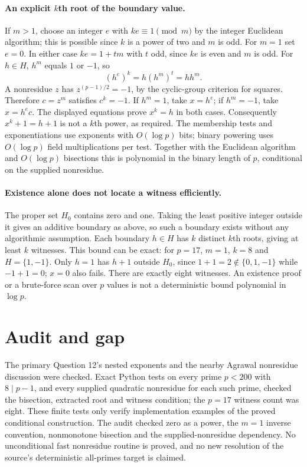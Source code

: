 \documentclass[11pt]{article}
\begin{document}
\paragraph{An explicit $k$th root of the boundary value.}
If $m>1$, choose an integer $e$ with $ke\equiv1\pmod m$ by the
integer Euclidean algorithm; this is possible since $k$ is a power of
two and $m$ is odd. For $m=1$ set $e=0$. In either case
$ke=1+tm$ with $t$ odd, since $ke$ is even and $m$ is odd.
For $h\in H$, $h^m$ equals $1$ or $-1$, so
\[
(h^e)^k=h(h^m)^t=h h^m.
\]
A nonresidue $z$ has $z^{(p-1)/2}=-1$, by the cyclic-group
criterion for squares. Therefore $c=z^m$ satisfies $c^k=-1$.
If $h^m=1$, take $x=h^e$; if $h^m=-1$, take $x=h^e c$.
The displayed equations prove $x^k=h$ in both cases. Consequently
$x^k+1=h+1$ is not a $k$th power, as required.
The membership tests and exponentiations use exponents with
$O(\log p)$ bits; binary powering uses $O(\log p)$ field
multiplications per test. Together with the Euclidean algorithm and
$O(\log p)$ bisections this is polynomial in the binary length of
$p$, conditional on the supplied nonresidue.

\paragraph{Existence alone does not locate a witness efficiently.}
The proper set $H_0$ contains zero and one. Taking the least positive
integer outside it gives an additive boundary as above, so such a
boundary exists without any algorithmic assumption. Each boundary
$h\in H$ has $k$ distinct $k$th roots, giving at least $k$ witnesses.
This bound can be exact: for $p=17$, $m=1$, $k=8$ and
$H=\{1,-1\}$. Only $h=1$ has $h+1$ outside $H_0$, since
$1+1=2\notin\{0,1,-1\}$ while $-1+1=0$; $x=0$ also fails.
There are exactly eight witnesses. An existence proof or a brute-force
scan over $p$ values is not a deterministic bound polynomial in $\log p$.

\section{Audit and gap}
The primary Question 12's nested exponents and the nearby Agrawal
nonresidue discussion were checked. Exact Python tests on every prime
$p<200$ with $8\mid p-1$, and every supplied quadratic nonresidue for
each such prime, checked the bisection, extracted root and witness
condition; the $p=17$ witness count was eight. These finite tests only
verify implementation examples of the proved conditional construction.
The audit checked zero as a power, the $m=1$ inverse convention,
nonmonotone bisection and the supplied-nonresidue dependency. No
unconditional fast nonresidue routine is proved, and no new resolution
of the source's deterministic all-primes target is claimed.
\end{document}
